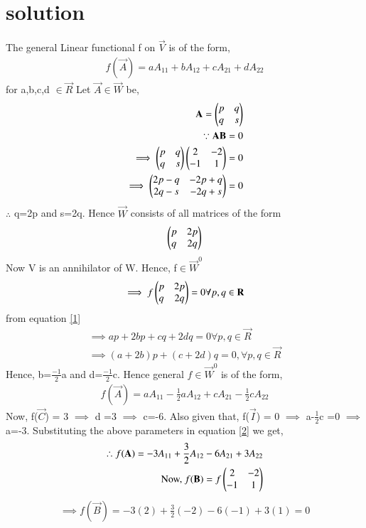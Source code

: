 \documentclass[journal,12pt,twocolumn]{IEEEtran}
\begin{document}
\section{solution}
The general Linear functional f on $\vec{V}$ is of the form,
\begin{align}
f(\vec{A}) = aA_{11}+bA_{12}+cA_{21}+dA_{22}
\label{1}
\end{align}
for a,b,c,d $\in\vec{R}$
Let $\vec{A} \in \vec{W}$ be,
\begin{align}
\mathbf{A} = \begin{pmatrix}p&q\\q&s\end{pmatrix}\\
\because \mathbf{AB} = 0\\
\implies \begin{pmatrix}p&q\\q&s\end{pmatrix}\begin{pmatrix}2&-2\\-1&1\end{pmatrix} = 0\\
\implies \begin{pmatrix}2p-q&-2p+q\\2q-s&-2q+s\end{pmatrix} = 0
\end{align}
$\therefore$ q=2p and s=2q.
Hence $\vec{W}$ consists of all matrices of the form 
\begin{align}
\begin{pmatrix}p&2p\\q&2q\end{pmatrix}
\end{align}
Now V is an annihilator of W. Hence, f$\in\vec{W}^0$
\begin{align}
\implies f\begin{pmatrix}p&2p\\q&2q\end{pmatrix} = 0 \forall p,q \in \mathbf{R}
\end{align}
from equation \eqref{1}
\begin{align}
\implies ap+2bp+cq+2dq = 0 \forall p,q \in \vec{R}\\
\implies (a+2b)p + (c+2d)q = 0, \forall p,q \in \vec{R}
\end{align}
Hence, b=$\frac{-1}{2}$a and d=$\frac{-1}{2}$c. Hence general $f\in\vec{W}^0$ is of the form,
\begin{align}
f(\vec{A}) = aA_{11}-\frac{1}{2}a A_{12}+cA_{21}-\frac{1}{2}cA_{22}
\label{2}
\end{align}
Now, f($\vec{C}$) = 3 $\implies$ d =3 $\implies$ c=-6. Also given that, f($\vec{I}$) = 0 $\implies$ a-$\frac{1}{2}$c =0 $\implies$ a=-3. Substituting the above parameters in equation \eqref{2} we get,
\begin{align}
\therefore f(\mathbf{A}) = -3A_{11}+\frac{3}{2} A_{12}-6A_{21}+3A_{22} \\
\mbox{Now, } f(\mathbf{B}) = f\begin{pmatrix}2&-2\\-1&1\end{pmatrix} 
\end{align}
\begin{align}
\implies f(\vec{B}) = -3(2)+\frac{3}{2}(-2)-6(-1)+3(1) = 0 
\end{align}
\end{document}
